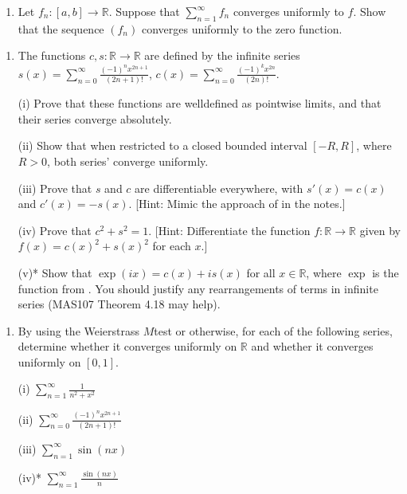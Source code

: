 \documentclass[letterpaper,10pt,english]{jupyterBook}
\begin{document}
\label{\detokenize{Problems:id60}}\begin{enumerate}
%
\setcounter{enumi}{59}
\item {} 
\sphinxAtStartPar
Let \(f_n:[a,b]\to\mathbb{R}\). Suppose that \(\sum_{n=1}^\infty f_n\) converges uniformly to \(f\). Show that the sequence \((f_n)\) converges uniformly to the zero function.

\end{enumerate}
\label{\detokenize{Problems:id61}}\begin{enumerate}
%
\setcounter{enumi}{60}
\item {} 
\sphinxAtStartPar
The functions \(c,s:\mathbb{R}\to\mathbb{R}\) are defined by the infinite series \(s(x) = \sum_{n=0}^\infty\frac{(-1)^nx^{2n+1}}{(2n+1)!}\), \(c(x) = \sum_{n=0}^\infty\frac{(-1)^kx^{2n}}{(2n)!}\).

\sphinxAtStartPar
(i) Prove that these functions are well\sphinxhyphen{}defined as pointwise limits, and that their series converge absolutely.

\sphinxAtStartPar
(ii) Show that when restricted to a closed bounded interval \([-R,R]\), where \(R>0\), both series’ converge uniformly.

\sphinxAtStartPar
(iii) Prove that \(s\) and \(c\) are differentiable everywhere, with \(s'(x)=c(x)\) and \(c'(x)=-s(x)\).
{[}Hint: Mimic the approach of  in the notes.{]}

\sphinxAtStartPar
(iv) Prove that \(c^2+s^2=1\). {[}Hint: Differentiate the function \(f:\mathbb{R}\to\mathbb{R}\) given by \(f(x)=c(x)^2+s(x)^2\) for each \(x\).{]}

\sphinxAtStartPar
(v)* Show that \(\exp(ix)=c(x)+is(x)\) for all \(x\in\mathbb{R}\), where \(\exp\) is the function from . You should justify any rearrangements of terms in infinite series (MAS107 Theorem 4.18 may help).

\end{enumerate}
\label{\detokenize{Problems:id62}}\begin{enumerate}
%
\setcounter{enumi}{61}
\item {} 
\sphinxAtStartPar
By using the Weierstrass \(M\)\sphinxhyphen{}test or otherwise, for each of the following series, determine whether it  converges uniformly on \(\mathbb{R}\) and  whether it converges uniformly on \([0,1]\).

\sphinxAtStartPar
(i) \(\displaystyle\sum_{n=1}^\infty \frac{1}{n^2 +x^2}\)

\sphinxAtStartPar
(ii) \(\displaystyle\sum_{n=0}^\infty \frac{(-1)^nx^{2n+1}}{(2n+1)!}\)

\sphinxAtStartPar
(iii) \(\displaystyle\sum_{n=1}^\infty \sin (nx)\)

\sphinxAtStartPar
(iv)* \(\displaystyle\sum_{n=1}^\infty \frac{\sin (nx)}{n}\)

\end{enumerate}
\end{document}
